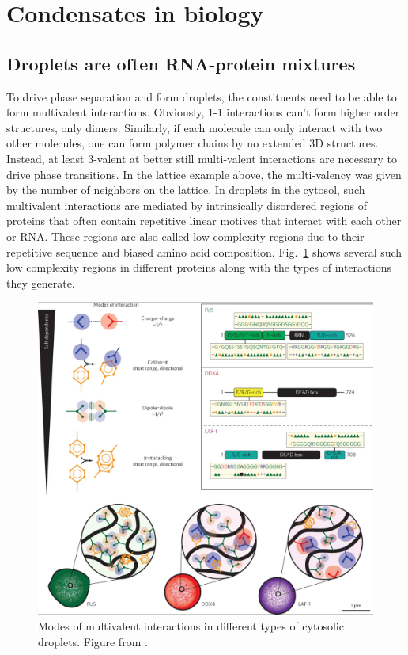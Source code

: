 \section{Condensates in biology}

\subsection*{Droplets are often RNA-protein mixtures}
To drive phase separation and form droplets, the constituents need to be able to form multivalent interactions.
Obviously, 1-1 interactions can't form higher order structures, only dimers.
Similarly, if each molecule can only interact with two other molecules, one can form polymer chains by no extended 3D structures.
Instead, at least 3-valent at better still multi-valent interactions are necessary to drive phase transitions.
In the lattice example above, the multi-valency was given by the number of neighbors on the lattice.
In droplets in the cytosol, such multivalent interactions are mediated by intrinsically disordered regions of proteins that often contain repetitive linear motives that interact with each other or RNA.
These regions are also called low complexity regions due to their repetitive sequence and biased amino acid composition.
Fig.~\ref{fig:mol_interactions} shows several such low complexity regions in different proteins along with the types of interactions they generate.

\begin{figure}[tb]
	\centering
	\includegraphics[width=\textwidth]{figures/Brangwynne_molecular_basis.png}
	\caption{Modes of multivalent interactions in different types of cytosolic droplets. Figure from \citet{brangwynne_polymer_2015}.}
	\label{fig:mol_interactions}
\end{figure}

